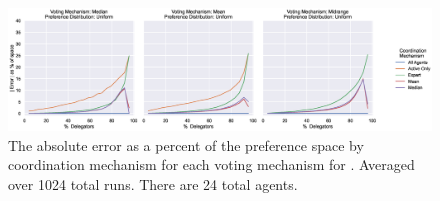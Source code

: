 \begin{landscape}
    \begin{figure}[p]
        \centering
        \includegraphics[scale=0.55]
        {content/chapter2/figures/distributions/Uniform_error_as_percent_of_space_abs_mean}
        \caption{
            The absolute error as a percent of the preference space by coordination
            mechanism for each voting mechanism for .
            Averaged over 1024 total runs.
            There are 24 total agents.
        }
        \label{fig:uniform-error-as-percent-of-space-abs-mean}
    \end{figure}
\end{landscape}
